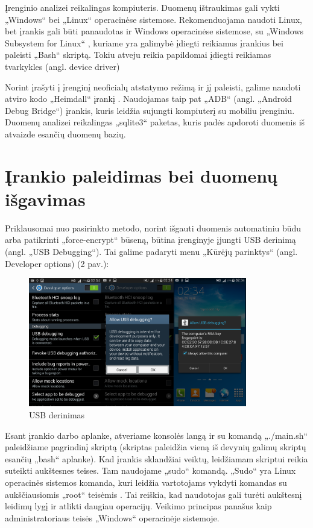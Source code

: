 \documentclass[a4paper,12pt,fleqn]{article}
\begin{document}
Įrenginio analizei reikalingas kompiuteris. Duomenų ištraukimas gali vykti „Windows“ bei „Linux“ operacinėse sistemose. Rekomenduojama naudoti Linux, bet įrankis gali būti panaudotas ir Windows operacinėse sistemose, su „Windows Subsystem for Linux“ \cite{WSL}, kuriame yra galimybė įdiegti reikiamus įrankius bei paleisti „Bash“ skriptą. Tokiu atveju reikia papildomai įdiegti reikiamas tvarkykles (angl. device driver)

Norint įrašyti į įrenginį neoficialų atstatymo režimą ir jį paleisti, galime naudoti atviro kodo „Heimdall“ įrankį \cite{heimdall}.  Naudojamas taip pat „ADB“ (angl. „Android Debug Bridge“) įrankis, kuris leidžia sujungti kompiuterį su mobiliu įrenginiu. Duomenų analizei reikalingas „sqlite3“ paketas, kuris padės apdoroti duomenis iš atvaizde esančių duomenų bazių.

\section{Įrankio paleidimas bei duomenų išgavimas}

Priklausomai nuo pasirinkto metodo, norint išgauti duomenis automatiniu būdu arba patikrinti „force-encrypt“ būseną, būtina įrenginyje įjungti USB derinimą (angl. „USB Debugging“). Tai galime padaryti menu „Kūrėjų parinktys“ (angl. Developer options) (2 pav.):

\begin{figure} [h]
    \centering
    \includegraphics[width=0.85\textwidth]{usb-debugging.png}
    \caption{USB derinimas}
    \label{fig:debugging}
\end{figure}
Esant įrankio darbo aplanke, atveriame konsolės langą ir su komandą „./main.sh“ paleidžiame pagrindinį skriptą (skriptas paleidžia vieną iš devynių galimų skriptų esančių „bash“ aplanke). 
Kad įrankis sklandžiai veiktų, leidžiamam skriptui reikia suteikti aukštesnes teises.  Tam naudojame „sudo“  komandą. „Sudo“  yra Linux operacinės sistemos komanda, kuri leidžia vartotojams vykdyti komandas su aukščiausiomis „root“ teisėmis . Tai reiškia, kad naudotojas gali turėti aukštesnį leidimų lygį ir atlikti  daugiau operacijų. Veikimo principas panašus kaip administratoriaus teisės „Windows“ operacinėje sistemoje.\\
\end{document}
